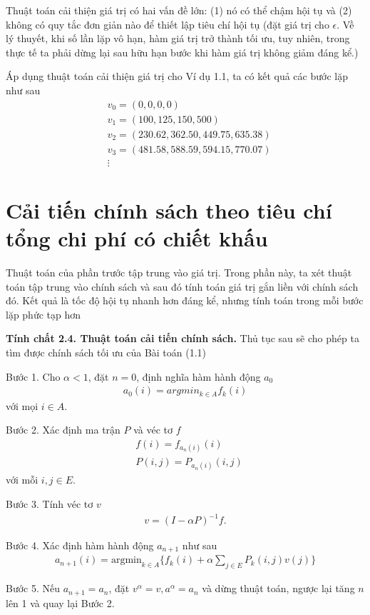 \documentclass[12pt,a4paper]{report}
\begin{document}
  
   \selectfont
  Thuật toán cải thiện giá trị có hai vấn đề lớn: (1) nó có thể chậm hội tụ và (2) không có quy tắc đơn giản nào để thiết lập tiêu chí hội tụ (đặt giá trị cho $\epsilon$. Về lý thuyết, khi số lần lặp vô hạn, hàm giá trị trở thành tối ưu, tuy nhiên, trong thực tế ta phải dừng lại sau hữu hạn bước khi hàm giá trị không giảm đáng kể.)
  
  \medskip
  Áp dụng thuật toán cải thiện giá trị cho Ví dụ 1.1, ta có kết quả các bước lặp như sau
  \begin{align*}
  &v_0=(0,0,0,0)\\
  &v_1=(100,125,150,500)\\
  &v_2=(230.62, 362.50, 449.75, 635.38)\\
  &v_3=(481.58, 588.59, 594.15, 770.07)\\
  &\vdots
  \end{align*}
  
  \section{Cải tiến chính sách theo tiêu chí tổng chi phí có chiết khấu}
  Thuật toán của phần trước tập trung vào giá trị. Trong phần này, ta xét thuật toán tập trung vào chính sách và sau đó tính toán giá trị gắn liền với chính sách đó. Kết quả là tốc độ hội tụ nhanh hơn đáng kể, nhưng tính toán trong mỗi bước lặp phức tạp hơn
  
  \begin{shaded*}
  	\noindent
  	\textbf{Tính chất 2.4. {Thuật toán cải tiến chính sách}.}
  	\selectfont 
  	Thủ tục sau sẽ cho phép ta tìm được chính sách tối ưu của Bài toán (1.1)
  	
  	\medskip
  	\noindent
  	Bước 1. Cho $\alpha <1$, đặt $n=0$, định nghĩa hàm hành động $a_0$
  	\begin{align*}
  	a_0(i)=argmin_{k \in A}f_k(i)
  	\end{align*}
  	với mọi $i \in A$.
  	
  	\medskip
  	\noindent
  	Bước 2. Xác định ma trận $P$ và véc tơ $f$
  	\begin{align*}
  	&f(i)=f_{a_n(i)}(i)\\
  	&P(i,j)=P_{a_n(i)}(i,j)
  	\end{align*} 
  	với mỗi $i,j \in E$.
  	
  	\medskip
  	\noindent
  	Bước 3. Tính véc tơ $v$
  	\begin{align*}
  	v=(I-\alpha P)^{-1}f.
  	\end{align*}
  	
  	\medskip
  	\noindent
  	Bước 4. Xác định hàm hành động $a_{n+1}$ như sau
  	\begin{align*}
  	a_{n+1}(i)=\mathrm{argmin}_{k \in A}\{f_k(i)+\alpha \sum_{j \in E}P_k(i,j)v(j)\}
  	\end{align*}
  	
  	\medskip
  	\noindent
  	Bước 5. Nếu $a_{n+1}=a_n$, đặt $v^\alpha =v, a^\alpha =a_n$ và dừng thuật toán, ngược lại tăng $n$ lên 1 và quay lại Bước 2. 
  	
  \end{shaded*}
  
\end{document}
